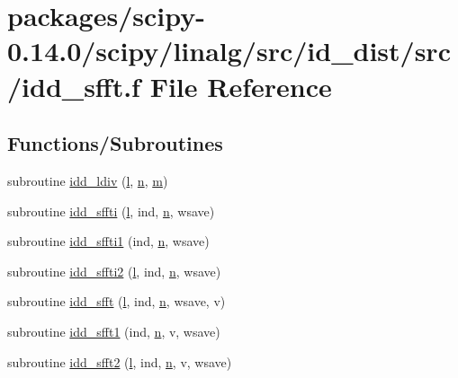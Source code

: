 \hypertarget{idd__sfft_8f}{}\section{packages/scipy-\/0.14.0/scipy/linalg/src/id\+\_\+dist/src/idd\+\_\+sfft.f File Reference}
\label{idd__sfft_8f}
\subsection*{Functions/\+Subroutines}
\begin{DoxyCompactItemize}
\item 
subroutine \hyperlink{idd__sfft_8f_a7bdc138831a97890b60c1985bf077875}{idd\+\_\+ldiv} (\hyperlink{indexexpr_8h_a88aacdaa46b76729743ee33ef8b95a58}{l}, \hyperlink{indexexpr_8h_ab427e2e2b4d6cec55fa088ea2a692ace}{n}, \hyperlink{indexexpr_8h_ab72fdb4031d47b75ab26dd18a437bcdc}{m})
\item 
subroutine \hyperlink{idd__sfft_8f_a33acaec976f44c34790ba38fac30c5d9}{idd\+\_\+sffti} (\hyperlink{indexexpr_8h_a88aacdaa46b76729743ee33ef8b95a58}{l}, ind, \hyperlink{indexexpr_8h_ab427e2e2b4d6cec55fa088ea2a692ace}{n}, wsave)
\item 
subroutine \hyperlink{idd__sfft_8f_a1da3dcec03bc8b67fc299b8257339662}{idd\+\_\+sffti1} (ind, \hyperlink{indexexpr_8h_ab427e2e2b4d6cec55fa088ea2a692ace}{n}, wsave)
\item 
subroutine \hyperlink{idd__sfft_8f_a3d474891b60e431363b9a7788e9e0084}{idd\+\_\+sffti2} (\hyperlink{indexexpr_8h_a88aacdaa46b76729743ee33ef8b95a58}{l}, ind, \hyperlink{indexexpr_8h_ab427e2e2b4d6cec55fa088ea2a692ace}{n}, wsave)
\item 
subroutine \hyperlink{idd__sfft_8f_afa7492538c4ab97ab0c1551853bfbfea}{idd\+\_\+sfft} (\hyperlink{indexexpr_8h_a88aacdaa46b76729743ee33ef8b95a58}{l}, ind, \hyperlink{indexexpr_8h_ab427e2e2b4d6cec55fa088ea2a692ace}{n}, wsave, v)
\item 
subroutine \hyperlink{idd__sfft_8f_a4484dad4bc68feb17b07f90b803ef9f3}{idd\+\_\+sfft1} (ind, \hyperlink{indexexpr_8h_ab427e2e2b4d6cec55fa088ea2a692ace}{n}, v, wsave)
\item 
subroutine \hyperlink{idd__sfft_8f_a07d92f1e86eb6d28ca1664ebc6f93a05}{idd\+\_\+sfft2} (\hyperlink{indexexpr_8h_a88aacdaa46b76729743ee33ef8b95a58}{l}, ind, \hyperlink{indexexpr_8h_ab427e2e2b4d6cec55fa088ea2a692ace}{n}, v, wsave)
\end{DoxyCompactItemize}


